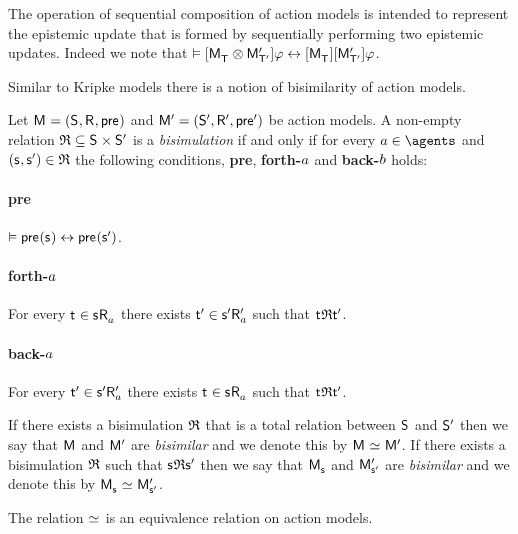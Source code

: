 The operation of sequential composition of action models is intended to represent the epistemic update that is formed by sequentially performing two epistemic updates.
Indeed we note that $\entails \actionA{\aPModel{\aStatesT} \compose \aPModelP{\aStatesTP}} \phi \iff \actionA{\aPModel{\aStatesT}} \actionA{\aPModelP{\aStatesTP}} \phi$.

Similar to Kripke models there is a notion of bisimilarity of action models.

\begin{definition}
Let $\aModelAndTuple$ and $\aModelAndTupleP$ be action models.
A non-empty relation $\bisimulation \subseteq \aStates \times \aStatesP$ is a {\em bisimulation} if and only if for every $\agentA \in \agents$ and $(\aStateS, \aStateSP) \in \bisimulation$ the following conditions, {\bf pre}, {\bf forth-$a$} and {\bf back-$b$} holds:

\paragraph{pre}
$\entails \aPrecondition(\aStateS) \iff \aPrecondition(\aStateSP)$.

\paragraph{forth-$a$}
For every $\aStateT \in \aSuccessorsA{\aStateS}$ there exists ${\mathsf{{t}}^{\prime}} \in {{\mathsf{{s}}^{\prime}}} {\mathsf{R}^{\prime}_{a}}$ such that $\aStateT \bisimulation \aStateTP$.

\paragraph{back-$a$}
For every ${\mathsf{{t}}^{\prime}} \in {{\mathsf{{s}}^{\prime}}} {\mathsf{R}^{\prime}_{a}}$ there exists $\aStateT \in \aSuccessorsA{\aStateS}$ such that $\aStateT \bisimulation \aStateTP$.

If there exists a bisimulation $\mathfrak{R}$ that is a total relation between $\aStates$ and ${\mathsf{S}^{\prime}}$ then we say that $\aModel$ and ${\mathsf{M}^{\prime}}$ are {\em bisimilar} and we denote this by $\aModel \bisimilar \aModelP$.
If there exists a bisimulation $\mathfrak{R}$ such that $\aStateS \bisimulation \aStateSP$ then we say that $\aPModel{\aStateS}$ and ${\mathsf{M}^{\prime}_{{\mathsf{{s}}^{\prime}}}}$ are {\em bisimilar} and we denote this by $\aPModel{\aStateS} \bisimilar \aPModelP{\aStateSP}$.
\end{definition}

\begin{proposition}
The relation $\bisimilar$ is an equivalence relation on action models.
\end{proposition}

